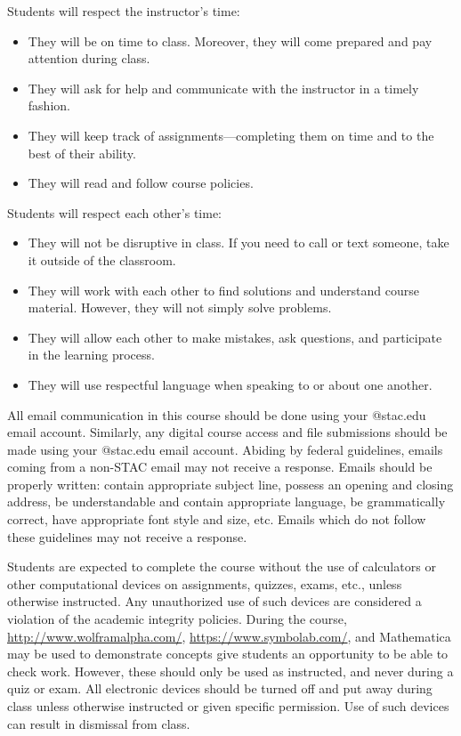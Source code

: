 \documentclass[11pt,letterpaper]{article}
\begin{document}
Students will respect the instructor's time:
	\begin{itemize}
	\item They will be on time to class. Moreover, they will come prepared and pay attention during class. 
	\item They will ask for help and communicate with the instructor in a timely fashion. 
	\item They will keep track of assignments---completing them on time and to the best of their ability.  
	\item They will read and follow course policies. 
	\end{itemize} \pspace

Students will respect each other's time:
	\begin{itemize}
	\item They will not be disruptive in class. If you need to call or text someone, take it outside of the classroom. 
	\item They will work with each other to find solutions and understand course material. However, they will not simply solve problems. 
	\item They will allow each other to make mistakes, ask questions, and participate in the learning process. 
	\item They will use respectful language when speaking to or about one another. 
	\end{itemize}
\pspace



All email communication in this course should be done using your @stac.edu email account. Similarly, any digital course access and file submissions should be made using your @stac.edu email account. Abiding by federal guidelines, emails coming from a non-STAC email may not receive a response. Emails should be properly written: contain appropriate subject line, possess an opening and closing address, be understandable and contain appropriate language, be grammatically correct, have appropriate font style and size, etc. Emails which do not follow these guidelines may not receive a response.
\pspace



Students are expected to complete the course without the use of calculators or other computational devices on assignments, quizzes, exams, etc., unless otherwise instructed. Any unauthorized use of such devices are considered a violation of the academic integrity policies. During the course, \href{http://www.wolframalpha.com/}{http://www.wolframalpha.com/}, \href{https://www.symbolab.com/}{https://www.symbolab.com/}, and Mathematica may be used to demonstrate concepts give students an opportunity to be able to check work. However, these should only be used as instructed, and never during a quiz or exam. All electronic devices should be turned off and put away during class unless otherwise instructed or given specific permission. Use of such devices can result in dismissal from class.
\sectionbreak
\end{document}
